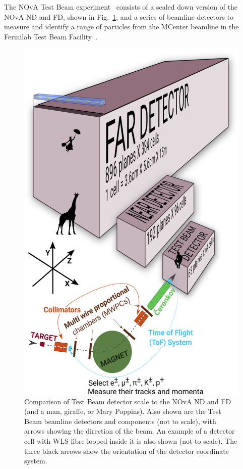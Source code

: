 The \gls{NOvA} Test Beam experiment~\cite{NOvA-doc-22172} consists of a scaled down version of the \gls{NOvA} \gls{ND} and \gls{FD}, shown in Fig.~\ref{fig:TBDetector}, and a series of beamline detectors to measure and identify a range of particles from the MCenter beamline in the Fermilab Test Beam Facility~\cite{FTBFWebsite}.

\begin{figure}[!ht]
\centering
\includegraphics[width=.7\textwidth]{Plots/TBCalibration/TestBeamDetectorWithArrows.png}
\caption[Comparison of Test Beam detector to the Near and Far Detectors]{Comparison of Test Beam detector scale to the \acrshort{NOvA} \acrshort{ND} and \acrshort{FD} (and a man, giraffe, or Mary Poppins). Also shown are the Test Beam beamline detectors and components (not to scale), with arrows showing the direction of the beam. An example of a detector cell with \acrshort{WLS} fibre looped inside it is also shown (not to scale). The three black arrows show the orientation of the detector coordinate system.}
\label{fig:TBDetector}
\end{figure}


